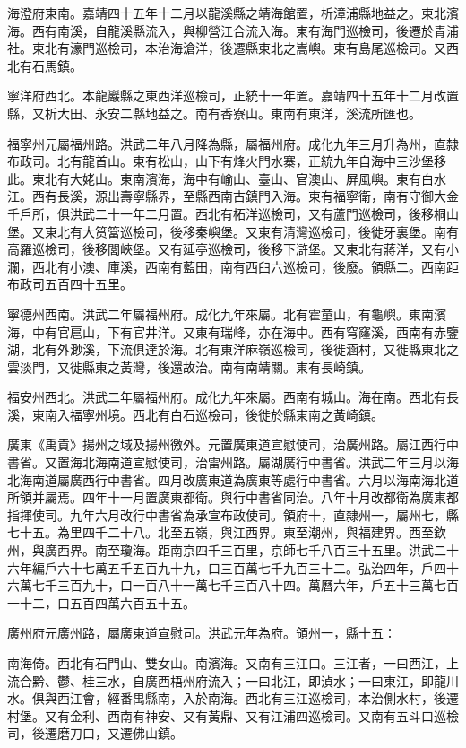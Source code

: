 海澄府東南。嘉靖四十五年十二月以龍溪縣之靖海館置，析漳浦縣地益之。東北濱海。西有南溪，自龍溪縣流入，與柳營江合流入海。東有海門巡檢司，後遷於青浦社。東北有濠門巡檢司，本治海滄洋，後遷縣東北之嵩嶼。東有島尾巡檢司。又西北有石馬鎮。

寧洋府西北。本龍巖縣之東西洋巡檢司，正統十一年置。嘉靖四十五年十二月改置縣，又析大田、永安二縣地益之。南有香寮山。東南有東洋，溪流所匯也。

福寧州元屬福州路。洪武二年八月降為縣，屬福州府。成化九年三月升為州，直隸布政司。北有龍首山。東有松山，山下有烽火門水寨，正統九年自海中三沙堡移此。東北有大姥山。東南濱海，海中有崳山、臺山、官澳山、屏風嶼。東有白水江。西有長溪，源出壽寧縣界，至縣西南古鎮門入海。東有福寧衛，南有守御大金千戶所，俱洪武二十一年二月置。西北有柘洋巡檢司，又有蘆門巡檢司，後移桐山堡。又東北有大筼簹巡檢司，後移秦嶼堡。又東有清灣巡檢司，後徙牙裏堡。南有高羅巡檢司，後移閭峽堡。又有延亭巡檢司，後移下滸堡。又東北有蔣洋，又有小瀾，西北有小澳、庫溪，西南有藍田，南有西臼六巡檢司，後廢。領縣二。西南距布政司五百四十五里。

寧德州西南。洪武二年屬福州府。成化九年來屬。北有霍童山，有龜嶼。東南濱海，中有官扈山，下有官井洋。又東有瑞峰，亦在海中。西有穹窿溪，西南有赤鑒湖，北有外渺溪，下流俱達於海。北有東洋麻嶺巡檢司，後徙涵村，又徙縣東北之雲淡門，又徙縣東之黃灣，後還故治。南有南靖關。東有長崎鎮。

福安州西北。洪武二年屬福州府。成化九年來屬。西南有城山。海在南。西北有長溪，東南入福寧州境。西北有白石巡檢司，後徙於縣東南之黃崎鎮。

廣東《禹貢》揚州之域及揚州徼外。元置廣東道宣慰使司，治廣州路。屬江西行中書省。又置海北海南道宣慰使司，治雷州路。屬湖廣行中書省。洪武二年三月以海北海南道屬廣西行中書省。四月改廣東道為廣東等處行中書省。六月以海南海北道所領并屬焉。四年十一月置廣東都衛。與行中書省同治。八年十月改都衛為廣東都指揮使司。九年六月改行中書省為承宣布政使司。領府十，直隸州一，屬州七，縣七十五。為里四千二十八。北至五嶺，與江西界。東至潮州，與福建界。西至欽州，與廣西界。南至瓊海。距南京四千三百里，京師七千八百三十五里。洪武二十六年編戶六十七萬五千五百九十九，口三百萬七千九百三十二。弘治四年，戶四十六萬七千三百九十，口一百八十一萬七千三百八十四。萬曆六年，戶五十三萬七百一十二，口五百四萬六百五十五。

廣州府元廣州路，屬廣東道宣慰司。洪武元年為府。領州一，縣十五：

南海倚。西北有石門山、雙女山。南濱海。又南有三江口。三江者，一曰西江，上流合黔、鬱、桂三水，自廣西梧州府流入；一曰北江，即湞水；一曰東江，即龍川水。俱與西江會，經番禺縣南，入於南海。西北有三江巡檢司，本治側水村，後遷村堡。又有金利、西南有神安、又有黃鼎、又有江浦四巡檢司。又南有五斗口巡檢司，後遷磨刀口，又遷佛山鎮。

